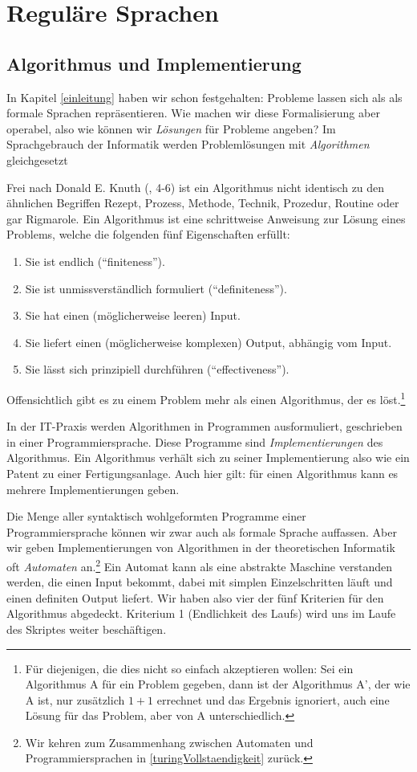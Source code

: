 \chapter{Reguläre Sprachen}

\section{Algorithmus und Implementierung}

In Kapitel \autoref{einleitung} haben wir schon festgehalten:
Probleme lassen sich als als formale Sprachen repräsentieren.
Wie machen wir diese Formalisierung aber operabel,
also wie können wir \emph{Lösungen} für Probleme angeben?
Im Sprachgebrauch der Informatik werden Problemlösungen
mit \emph{Algorithmen} gleichgesetzt

Frei nach Donald E. Knuth (\cite{knuth1}, 4-6) ist ein Algorithmus nicht identisch
zu den ähnlichen Begriffen 
Rezept, Prozess, Methode, Technik, Prozedur, Routine oder gar Rigmarole.
Ein Algorithmus ist eine schrittweise Anweisung zur Lösung eines Problems,
welche die folgenden fünf Eigenschaften erfüllt:
\begin{enumerate}
    \item Sie ist endlich (``finiteness'').
    \item Sie ist unmissverständlich formuliert (``definiteness'').
    \item Sie hat einen (möglicherweise leeren) Input.
    \item Sie liefert einen (möglicherweise komplexen) Output, abhängig vom Input.
    \item Sie lässt sich prinzipiell durchführen (``effectiveness'').
\end{enumerate}
Offensichtlich gibt es zu einem Problem mehr als einen Algorithmus,
der es löst.\footnote{Für diejenigen, die dies nicht so einfach akzeptieren wollen:
Sei ein Algorithmus A für ein Problem gegeben, dann ist der Algorithmus A', der wie A ist,
nur zusätzlich $1+1$ errechnet und das Ergebnis ignoriert,
auch eine Lösung für das Problem, aber von A unterschiedlich.}

In der IT-Praxis werden Algorithmen in Programmen ausformuliert,
geschrieben in einer Programmiersprache.
Diese Programme sind \emph{Implementierungen} des Algorithmus.
Ein Algorithmus verhält sich zu seiner Implementierung also wie
ein Patent zu einer Fertigungsanlage.
Auch hier gilt: für einen Algorithmus kann es mehrere Implementierungen geben. 

Die Menge aller syntaktisch wohlgeformten Programme einer Programmiersprache
können wir zwar auch als formale Sprache auffassen.
Aber wir geben Implementierungen von Algorithmen in der theoretischen Informatik
oft \emph{Automaten} an.\footnote{
    Wir kehren zum Zusammenhang zwischen Automaten und Programmiersprachen
    in \autoref{turingVollstaendigkeit} zurück.
}
Ein Automat kann als eine abstrakte Maschine verstanden werden,
die einen Input bekommt, 
dabei mit simplen Einzelschritten läuft
und einen definiten Output liefert.
Wir haben also vier der fünf Kriterien für den Algorithmus abgedeckt.
Kriterium 1 (Endlichkeit des Laufs) wird uns im Laufe des Skriptes weiter beschäftigen.

